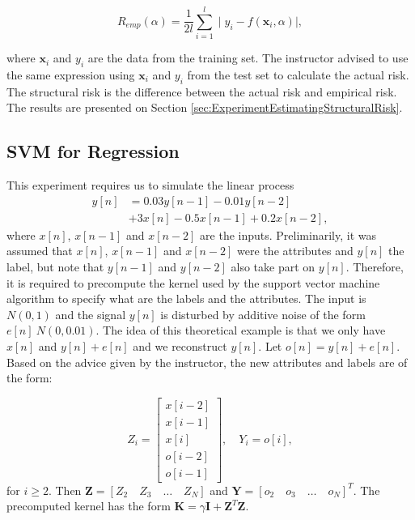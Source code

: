 \documentclass[letterpaper, 10 pt, conference]{ieeeconf}  %
\begin{document}
 \begin{equation}
  R_{emp}(\alpha) = \frac{1}{2l} \sum_{i=1}^{l} \mid y_{i} - f(\mathbf{x}_{i},\alpha) \mid,
  \label{eq:Error}
 \end{equation}
 
 where $\mathbf{x}_{i}$ and $y_{i}$ are the data from the training set. The instructor advised  to use the same expression using $\mathbf{x}_{i}$ and $y_{i}$ from
 the test set to calculate the actual risk. The structural risk is the difference between the actual risk and empirical risk.  The results are presented on Section  \ref{sec:ExperimentEstimatingStructuralRisk}.

\subsection{SVM for Regression}
\label{sec:TheorySVMRegression}

This experiment requires us to simulate the linear process
\begin{equation*}
\begin{aligned}
   y[n] &= 0.03y[n-1] - 0.01y[n-2] \\ &+ 3x[n] - 0.5x[n-1] + 0.2x[n-2],
\end{aligned}
\end{equation*}
where $x[n]$, $x[n-1]$ and $x[n-2]$ are the inputs. Preliminarily, it was assumed that $x[n]$, $x[n-1]$ and $x[n-2]$
were the attributes and $y[n]$ the label, but note that $y[n-1]$ and $y[n-2]$ also take part on  $y[n]$. Therefore, it
is required to precompute the kernel used by the support vector machine algorithm to specify  what are the labels 
and the attributes. The input is $N(0,1)$ and the signal $y[n]$ is disturbed by additive noise of the form $e[n] ~ N(0, 0.01)$. 
The idea of this theoretical example is that we only have $x[n]$ and  $y[n]+e[n]$ and we reconstruct $y[n]$. Let $o[n] = y[n]+e[n]$. 
Based on the advice given by the instructor, the new attributes and labels are of the form:

\begin{equation*}
 Z_{i} = \begin{bmatrix} x[i-2] \\ x[i-1] \\ x[i]\\ o[i-2] \\ o[i-1] \end{bmatrix},\quad Y_{i} = o[i],
\end{equation*}
for $i \geq 2$. Then $\mathbf{Z} = [  Z_{2} \quad Z_{3} \quad \hdots \quad  Z_{N}]$ and $\mathbf{Y} = [  o_{2} \quad o_{3} \quad \hdots \quad  o_{N}]^{T}$.
The precomputed kernel has the form $\mathbf{K} = \gamma \mathbf{I} + \mathbf{Z}^{T}\mathbf{Z}$. 
\end{document}
